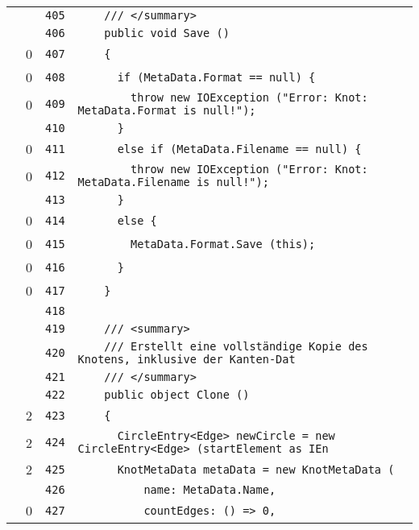 \documentclass[a4paper,10pt]{article}
\begin{document}
\begin{longtable}[l]{lrrl}
\cellcolor{gray} &  & \verb~405~ & \verb~    /// </summary>~\\
\cellcolor{gray} &  & \verb~406~ & \verb~    public void Save ()~\\
\cellcolor{red} & 0 & \verb~407~ & \verb~    {~\\
\cellcolor{red} & 0 & \verb~408~ & \verb~      if (MetaData.Format == null) {~\\
\cellcolor{red} & 0 & \verb~409~ & \verb~        throw new IOException ("Error: Knot: MetaData.Format is null!");~\\
\cellcolor{gray} &  & \verb~410~ & \verb~      }~\\
\cellcolor{red} & 0 & \verb~411~ & \verb~      else if (MetaData.Filename == null) {~\\
\cellcolor{red} & 0 & \verb~412~ & \verb~        throw new IOException ("Error: Knot: MetaData.Filename is null!");~\\
\cellcolor{gray} &  & \verb~413~ & \verb~      }~\\
\cellcolor{red} & 0 & \verb~414~ & \verb~      else {~\\
\cellcolor{red} & 0 & \verb~415~ & \verb~        MetaData.Format.Save (this);~\\
\cellcolor{red} & 0 & \verb~416~ & \verb~      }~\\
\cellcolor{red} & 0 & \verb~417~ & \verb~    }~\\
\cellcolor{gray} &  & \verb~418~ & \verb~~\\
\cellcolor{gray} &  & \verb~419~ & \verb~    /// <summary>~\\
\cellcolor{gray} &  & \verb~420~ & \verb~    /// Erstellt eine vollständige Kopie des Knotens, inklusive der Kanten-Dat~\\
\cellcolor{gray} &  & \verb~421~ & \verb~    /// </summary>~\\
\cellcolor{gray} &  & \verb~422~ & \verb~    public object Clone ()~\\
\cellcolor{green} & 2 & \verb~423~ & \verb~    {~\\
\cellcolor{green} & 2 & \verb~424~ & \verb~      CircleEntry<Edge> newCircle = new CircleEntry<Edge> (startElement as IEn~\\
\cellcolor{green} & 2 & \verb~425~ & \verb~      KnotMetaData metaData = new KnotMetaData (~\\
\cellcolor{gray} &  & \verb~426~ & \verb~          name: MetaData.Name,~\\
\cellcolor{red} & 0 & \verb~427~ & \verb~          countEdges: () => 0,~\\

\end{longtable}
\end{document}
